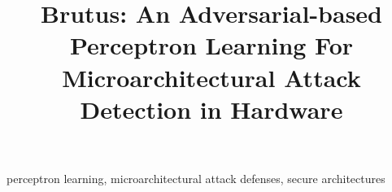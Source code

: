 \documentclass[conference]{IEEEtran}
\begin{document}
\title{Brutus: An Adversarial-based Perceptron Learning For Microarchitectural Attack Detection in Hardware \\

}

\setlength{\parskip}{1em}



\maketitle

\begin{IEEEkeywords}
perceptron learning, microarchitectural attack defenses, secure architectures
\end{IEEEkeywords}












\end{document}
